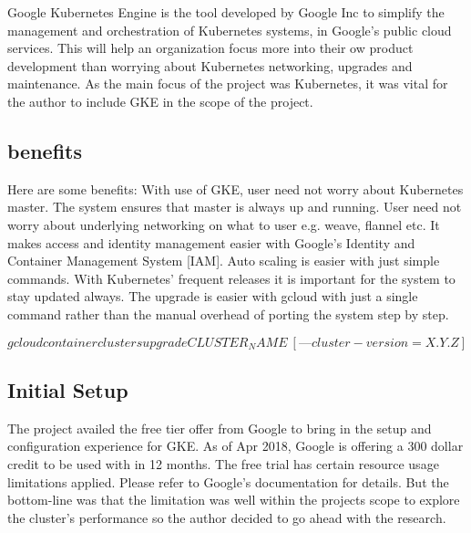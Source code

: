 Google Kubernetes Engine is the tool developed by Google Inc to simplify the 
management and orchestration of Kubernetes systems, in Google’s public cloud
 services. This will help an organization focus more into their ow product 
 development than worrying about Kubernetes networking, upgrades and 
 maintenance. As the main focus of the project was Kubernetes, it
was vital for the author to include GKE in the scope of the project.

\subsection{benefits}

Here are some benefits: With use of GKE, user need not worry about Kubernetes
 master. The system ensures that master is always up and running. User need not
  worry about underlying networking on what to user e.g. weave, flannel etc. It 
  makes access and identity management easier with Google’s Identity and 
  Container Management System [IAM]. Auto scaling is easier with just simple 
  commands. With Kubernetes’ frequent releases it is important for the system 
to stay updated always. The upgrade is easier with gcloud with just a single 
command rather than the manual overhead of porting the system step by step.

\begin{equation}
gcloud container clusters upgrade CLUSTER_NAME \  [ — cluster-version=X.Y.Z]
\end{equation}
\subsection{Initial Setup}
The project availed the free tier offer from Google to bring in the setup and 
configuration experience for GKE. As of Apr 2018, Google is offering a 300 
dollar credit to be used with in 12 months. The free trial has certain resource 
usage limitations applied. Please refer to Google’s documentation for details.
 But the bottom-line was that the limitation was well within the projects scope
  to explore the cluster’s performance so the author decided to go ahead with 
  the research. 

